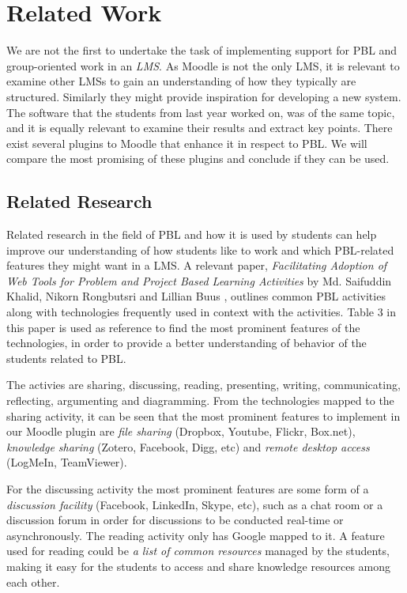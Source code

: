 \chapter{Related Work}
We are not the first to undertake the task of implementing support for PBL and group-oriented work in an \textit{LMS}. 
As Moodle is not the only LMS, it is relevant to examine other LMSs to gain an understanding of how they typically are structured. 
Similarly they might provide inspiration for developing a new system.
The software that the students from last year worked on, was of the same topic, and it is equally relevant to examine their results and extract key points.
There exist several plugins to Moodle that enhance it in respect to PBL. 
We will compare the most promising of these plugins and conclude if they can be used.

\section{Related Research}
Related research in the field of PBL and how it is used by students can help improve our understanding of how students like to work and which PBL-related features they might want in a LMS.
A relevant paper, \textit{Facilitating Adoption of Web Tools for Problem and Project Based Learning Activities} by Md. Saifuddin Khalid, Nikorn Rongbutsri and Lillian Buus \citep{khalidRongbutsriBuus}, outlines common PBL activities along with technologies frequently used in context with the activities.
Table 3  in this paper is used as reference to find the most prominent features of the technologies, in order to provide a better understanding of behavior of the students related to PBL.

The activies are sharing, discussing, reading, presenting, writing, communicating, reflecting, argumenting and diagramming.
From the technologies mapped to the sharing activity, it can be seen that the most prominent features to implement in our Moodle plugin are \textit{file sharing} (Dropbox, Youtube, Flickr, Box.net), \textit{knowledge sharing} (Zotero, Facebook, Digg, etc) and \textit{remote desktop access} (LogMeIn, TeamViewer).

For the discussing activity the most prominent features are some form of a \textit{discussion facility} (Facebook, LinkedIn, Skype, etc), such as a chat room or a discussion forum in order for discussions to be conducted real-time or asynchronously.
The reading activity only has Google mapped to it.
A feature used for reading could be \textit{a list of common resources} managed by the students, making it easy for the students to access and share knowledge resources among each other.

